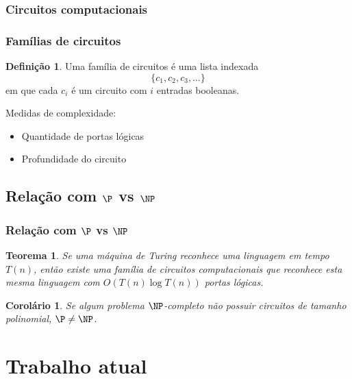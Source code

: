 \documentclass[utf8,notheorems]{beamer}
\newtheorem*{theorem}{Teorema}
\newtheorem*{corollary}{Corolário}
\theoremstyle{definition}
\newtheorem*{definition}{Definição}
\begin{document}
\begin{frame}
    \frametitle{Circuitos computacionais}
    \centering
\end{frame}

\begin{frame}
    \frametitle{Famílias de circuitos}
    \begin{definition}
        Uma família de circuitos é uma lista indexada
        \begin{equation*}
            \{c_1, c_2, c_3, \dots\}
        \end{equation*}
        em que cada $c_i$ é um circuito com $i$ entradas booleanas.
    \end{definition}

    \pause
    Medidas de complexidade:
    \begin{itemize}
        \item Quantidade de portas lógicas
        \item Profundidade do circuito
    \end{itemize}
\end{frame}

\subsection{Relação com $\P$ vs $\NP$}
\begin{frame}
    \frametitle{Relação com $\P$ vs $\NP$}
    \begin{theorem}
        Se uma máquina de Turing reconhece uma linguagem em tempo $T(n)$,
        então existe uma família de circuitos computacionais
        que reconhece esta mesma linguagem
        com $O(T(n) \log T(n))$ portas lógicas.
    \end{theorem}
    \pause
    \begin{corollary}
        Se algum problema $\NP$-completo
        não possuir circuitos de tamanho polinomial,
        $\P \neq \NP$.
    \end{corollary}
\end{frame}


\section{Trabalho atual}
\end{document}
